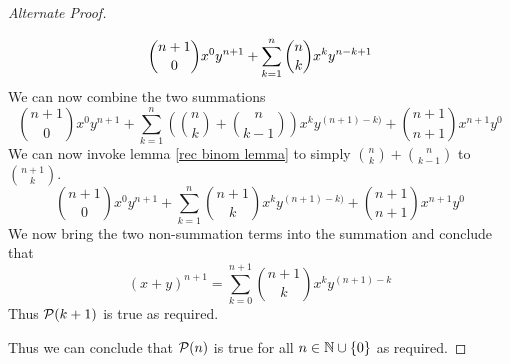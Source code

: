 \begin{proof}[Alternate Proof]
\begin{itemize}
\[                        \dbinom{n + 1}{0} x^0y^{n + 1} + \displaystyle\sum_{k = 1}^{n} \dbinom{n}{k}x^k y^{n - k + 1}
                    \]
                    We can now combine the two summations
                    \[
                        \binom{n + 1}{0} x^0y^{n + 1} + 
                        \sum_{k = 1}^{n} \left(\binom{n}{k} + \binom{n}{k - 1}\right) x^{k} y^{(n + 1) - k)} + 
                        \binom{n + 1}{n + 1} x^{n + 1}y^0 
                    \]
                    We can now invoke lemma \ref{rec binom lemma} to simply $\binom{n}{k} + \binom{n}{k - 1}$
                    to $\binom{n + 1}{k}$.
                    \[
                        \binom{n + 1}{0} x^0y^{n + 1} + 
                        \sum_{k = 1}^{n} \binom{n + 1}{k}x^{k} y^{(n + 1) - k)} + 
                        \binom{n + 1}{n + 1} x^{n + 1}y^0
                    \]
                    We now bring the two non-summation terms into the summation and conclude
                    that
                    \[
                        (x + y)^{n + 1} = \sum_{k = 0}^{n + 1} \binom{n + 1}{k} x^k y^{(n + 1) - k}
                    \]
                    Thus $\mathcal{P}(k + 1)$ is true as required.
            \end{itemize}
            Thus we can conclude that $\mathcal{P}(n)$ is true for all $n \in \mathbb{N} \cup \left\{0\right\}$
            as required. \QED
        \end{proof}
    
